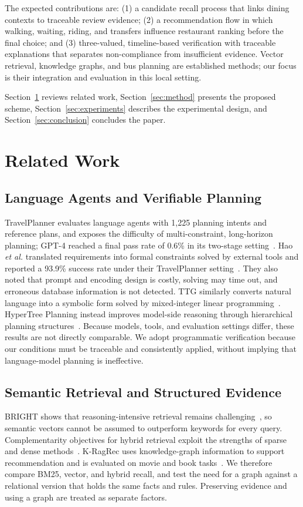 \documentclass[conference]{IEEEtran}
\begin{document}
The expected contributions are: (1) a candidate recall process that links dining contexts to traceable review evidence; (2) a recommendation flow in which walking, waiting, riding, and transfers influence restaurant ranking before the final choice; and (3) three-valued, timeline-based verification with traceable explanations that separates non-compliance from insufficient evidence. Vector retrieval, knowledge graphs, and bus planning are established methods; our focus is their integration and evaluation in this local setting.

Section~\ref{sec:related} reviews related work, Section~\ref{sec:method} presents the proposed scheme, Section~\ref{sec:experiments} describes the experimental design, and Section~\ref{sec:conclusion} concludes the paper.

\section{Related Work}\label{sec:related}
\subsection{Language Agents and Verifiable Planning}
TravelPlanner evaluates language agents with 1,225 planning intents and reference plans, and exposes the difficulty of multi-constraint, long-horizon planning; GPT-4 reached a final pass rate of 0.6\% in its two-stage setting~\cite{llm_planning}. Hao \emph{et al.} translated requirements into formal constraints solved by external tools and reported a 93.9\% success rate under their TravelPlanner setting~\cite{llm_planning_tools}. They also noted that prompt and encoding design is costly, solving may time out, and erroneous database information is not detected. TTG similarly converts natural language into a symbolic form solved by mixed-integer linear programming~\cite{ttg}. HyperTree Planning instead improves model-side reasoning through hierarchical planning structures~\cite{hypertree_planning}. Because models, tools, and evaluation settings differ, these results are not directly comparable. We adopt programmatic verification because our conditions must be traceable and consistently applied, without implying that language-model planning is ineffective.

\subsection{Semantic Retrieval and Structured Evidence}
BRIGHT shows that reasoning-intensive retrieval remains challenging~\cite{bright}, so semantic vectors cannot be assumed to outperform keywords for every query. Complementarity objectives for hybrid retrieval exploit the strengths of sparse and dense methods~\cite{hybrid_retrieval}. K-RagRec uses knowledge-graph information to support recommendation and is evaluated on movie and book tasks~\cite{knowledge_graph_llm_recommendation}. We therefore compare BM25, vector, and hybrid recall, and test the need for a graph against a relational version that holds the same facts and rules. Preserving evidence and using a graph are treated as separate factors.
\end{document}
